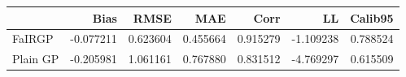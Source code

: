 \begin{tabular}{lrrrrrr}
\toprule
{} &      Bias &      RMSE &       MAE &      Corr &        LL &   Calib95 \\
\midrule
FaIRGP   & -0.077211 &  0.623604 &  0.455664 &  0.915279 & -1.109238 &  0.788524 \\
Plain GP & -0.205981 &  1.061161 &  0.767880 &  0.831512 & -4.769297 &  0.615509 \\
\bottomrule
\end{tabular}
